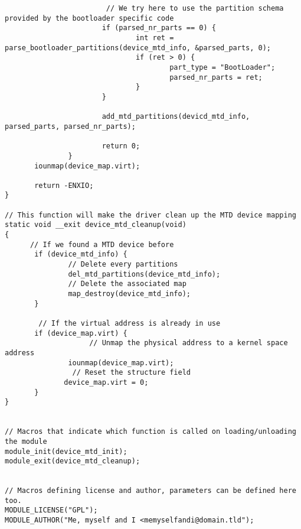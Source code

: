 \begin{verbatim}
						// We try here to use the partition schema provided by the bootloader specific code
                       if (parsed_nr_parts == 0) {
                               int ret = parse_bootloader_partitions(device_mtd_info, &parsed_parts, 0);
                               if (ret > 0) {
                                       part_type = "BootLoader";
                                       parsed_nr_parts = ret;
                               }
                       }

                       add_mtd_partitions(devicd_mtd_info, parsed_parts, parsed_nr_parts);

                       return 0;
               }
       iounmap(device_map.virt);

       return -ENXIO;
}

// This function will make the driver clean up the MTD device mapping
static void __exit device_mtd_cleanup(void)
{
	  // If we found a MTD device before
       if (device_mtd_info) {
			   // Delete every partitions
               del_mtd_partitions(device_mtd_info);
			   // Delete the associated map
               map_destroy(device_mtd_info);
       }
	
		// If the virtual address is already in use
       if (device_map.virt) {
					// Unmap the physical address to a kernel space address
               iounmap(device_map.virt);
				// Reset the structure field
              device_map.virt = 0;
       }
}


// Macros that indicate which function is called on loading/unloading the module
module_init(device_mtd_init);
module_exit(device_mtd_cleanup);


// Macros defining license and author, parameters can be defined here too.
MODULE_LICENSE("GPL");
MODULE_AUTHOR("Me, myself and I <memyselfandi@domain.tld");
\end{verbatim}
